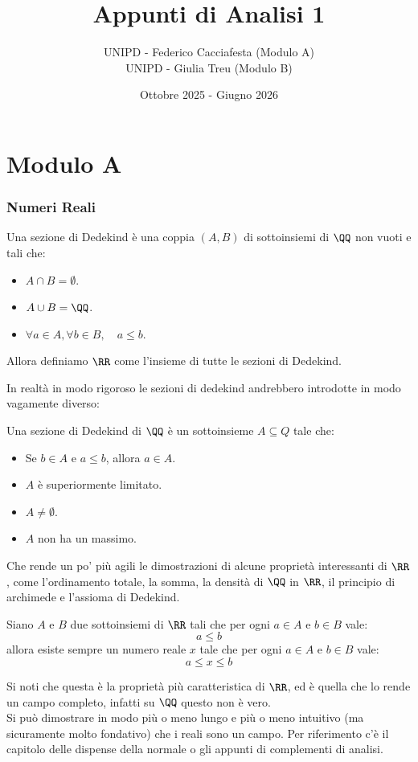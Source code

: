 \documentclass[11pt]{scrartcl}
\begin{document}
	\title{Appunti di Analisi 1}
	\subtitle{
		UNIPD - Federico Cacciafesta (Modulo A) \\
		UNIPD - Giulia Treu (Modulo B)	
	}
	\date{Ottobre 2025 - Giugno 2026}
	
	
	\maketitle
	
	\tableofcontents
	
	\newpage
	\part{Modulo A}
	\section{Numeri Reali}
	
	\begin{definition}
		Una sezione di Dedekind è una coppia $(A,B)$ di sottoinsiemi di $\QQ$ non vuoti e tali che:
		\begin{itemize}
			\item $A\cap B=\emptyset$.
			\item $A\cup B=\QQ$.
			\item $\forall a\in A,\forall b\in B, \quad a \le b$.
		\end{itemize}
		Allora definiamo $\RR$ come l'insieme di tutte le sezioni di Dedekind.
	\end{definition}
	
	In realtà in modo rigoroso le sezioni di dedekind andrebbero introdotte in modo vagamente diverso:
	
	\begin{definition}
		Una sezione di Dedekind di $\QQ$ è un sottoinsieme $A\subseteq Q$ tale che:
		\begin{itemize}
			\item Se $b\in A$ e $a\le b$, allora $a\in A$.
			\item $A$ è superiormente limitato.
			\item $A\ne\emptyset$.
			\item $A$ non ha un massimo.
		\end{itemize}
	\end{definition}
	Che rende un po' più agili le dimostrazioni di alcune proprietà interessanti di $\RR$, come l'ordinamento totale, la somma, la densità di $\QQ$ in $\RR$, il principio di archimede e l'assioma di Dedekind.
	\begin{proposition}
		Siano $A$ e $B$ due sottoinsiemi di $\RR$ tali che per ogni $a\in A$ e $b\in B$ vale:
		$$a\le b$$
		allora esiste sempre un numero reale $x$ tale che per ogni $a\in A$ e $b\in B$ vale:
		$$a\le x \le b$$
	\end{proposition}
	Si noti che questa è la proprietà più caratteristica di $\RR$, ed è quella che lo rende un campo completo, infatti su $\QQ$ questo non è vero. \\
	Si può dimostrare in modo più o meno lungo e più o meno intuitivo (ma sicuramente molto fondativo) che i reali sono un campo. Per riferimento c'è il capitolo delle dispense della normale o gli appunti di complementi di analisi.
\end{document}
